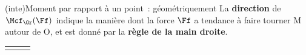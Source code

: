 \documentclass[../../main/main.tex]{subfiles}
\begin{document}
\begin{tcb*}(inte){Moment par rapport à un point~: géométriquement}
	La \textbf{direction} de $\Mcf_{\Or}(\Ff)$ indique la manière dont la force
	$\Ff$ a tendance à faire tourner M autour de O, et est donné par la
	\textbf{règle de la main droite}.
	\begin{center}
		\begin{tabularx}{\linewidth}{Y|Y|Y}
			 &
\end{tabularx}
\end{center}
\end{tcb*}
\end{document}
